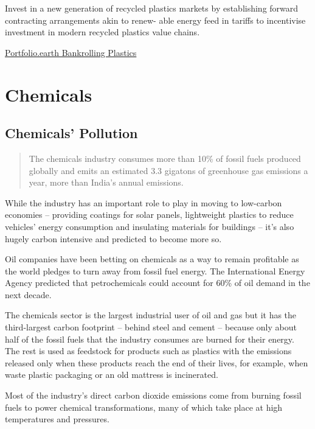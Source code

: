 \documentclass[
]{book}
\begin{document}
Invest in a new generation of recycled
plastics markets by establishing forward
contracting arrangements akin to renew-
able energy feed in tariffs to incentivise
investment in modern recycled plastics
value chains.

\href{https://portfolio.earth/campaigns/bankrolling-plastics/}{Portfolio.earth Bankrolling Plastics}

\hypertarget{chemicals}{%
\section{Chemicals}\label{chemicals}}

\hypertarget{chemicals-pollution}{%
\subsection{Chemicals' Pollution}\label{chemicals-pollution}}

\begin{quote}
The chemicals industry consumes more than 10\% of fossil fuels produced globally and emits an estimated 3.3 gigatons of greenhouse gas emissions a year, more than India's annual emissions.
\end{quote}

While the industry has an important role to play in moving to low-carbon economies -- providing coatings for solar panels, lightweight plastics to reduce vehicles' energy consumption and insulating materials for buildings -- it's also hugely carbon intensive and predicted to become more so.

Oil companies have been betting on chemicals as a way to remain profitable as the world pledges to turn away from fossil fuel energy. The International Energy Agency predicted that petrochemicals could account for 60\% of oil demand in the next decade.

The chemicals sector is the largest industrial user of oil and gas but it has the third-largest carbon footprint -- behind steel and cement -- because only about half of the fossil fuels that the industry consumes are burned for their energy. The rest is used as feedstock for products such as plastics with the emissions released only when these products reach the end of their lives, for example, when waste plastic packaging or an old mattress is incinerated.

Most of the industry's direct carbon dioxide emissions come from burning fossil fuels to power chemical transformations, many of which take place at high temperatures and pressures.
\end{document}
